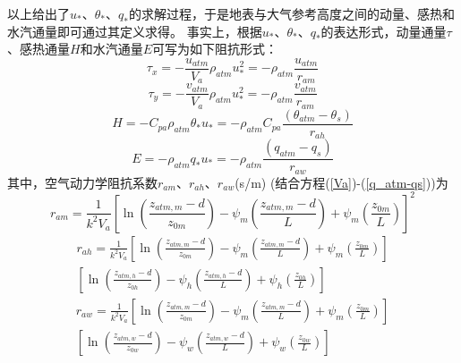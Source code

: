 以上给出了$u_\ast$、$\theta_\ast$、$q_\ast$的求解过程，于是地表与大气参考高度之间的动量、感热和水汽通量即可通过其定义求得。
事实上，根据$u_\ast$、$\theta_\ast$、$q_\ast$的表达形式，动量通量$\tau$、感热通量$H$和水汽通量$E$可写为如下阻抗形式：
\begin{equation}
\tau_{x}=-\frac{u_{atm}}{V_{a}} \rho_{atm} u_{*}^{2}=-\rho_{atm} \frac{u_{atm}}{r_{a m}}
\end{equation}
\begin{equation}
\tau_{y}=-\frac{v_{atm}}{V_{a}} \rho_{atm} u_{*}^{2}=-\rho_{atm} \frac{v_{atm}}{r_{a m}}
\end{equation}
\begin{equation}
H=-C_{p a} \rho_{atm} \theta_{*} u_{*}=-\rho_{atm} C_{p a} \frac{\left(\theta_{atm}-\theta_{s}\right)}{r_{a h}}
\end{equation}
\begin{equation}
E=-\rho_{atm} q_{*} u_{*}=-\rho_{atm} \frac{\left(q_{atm}-q_{s}\right)}{r_{a w}}
\end{equation}
其中，空气动力学阻抗系数$r_{am}$、$r_{ah}$、$r_{aw}$(s/m) (结合方程(\ref{Va})-(\ref{q_atm-qs}))为
\begin{equation}\label{ram}
r_{a m}=\frac{1}{k^{2} V_{a}}\left[\ln \left(\frac{z_{atm, m}-d}{z_{0 m}}\right)-\psi_{m}\left(\frac{z_{atm, m}-d}{L}\right)+\psi_{m}\left(\frac{z_{0 m}}{L}\right)\right]^{2}
\end{equation}
\begin{equation}\label{rah}
\begin{array}{c}r_{a h}=\frac{1}{k^{2} V_{a}}\left[\ln \left(\frac{z_{atm, m}-d}{z_{0 m}}\right)-\psi_{m}\left(\frac{z_{atm, m}-d}{L}\right)+\psi_{m}\left(\frac{z_{0 m}}{L}\right)\right] \\ {\left[\ln \left(\frac{z_{atm, h}-d}{z_{0 h}}\right)-\psi_{h}\left(\frac{z_{atm, h}-d}{L}\right)+\psi_{h}\left(\frac{z_{0 h}}{L}\right)\right]}\end{array}
\end{equation}
\begin{equation}\label{raw}
\begin{array}{c}r_{a w}=\frac{1}{k^{2} V_{a}}\left[\ln \left(\frac{z_{atm, m}-d}{z_{0 m}}\right)-\psi_{m}\left(\frac{z_{atm, m}-d}{L}\right)+\psi_{m}\left(\frac{z_{0 m}}{L}\right)\right] \\ {\left[\ln \left(\frac{z_{atm, w}-d}{z_{0 w}}\right)-\psi_{w}\left(\frac{z_{atm, w}-d}{L}\right)+\psi_{w}\left(\frac{z_{0 w}}{L}\right)\right]}\end{array}
\end{equation}

